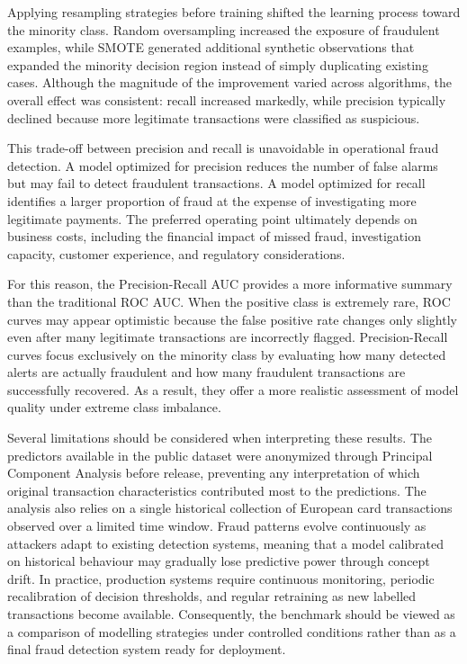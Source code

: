 \documentclass[
  12pt,
  letterpaper,
]{book}
\begin{document}
Applying resampling strategies before training shifted the learning
process toward the minority class. Random oversampling increased the
exposure of fraudulent examples, while SMOTE generated additional
synthetic observations that expanded the minority decision region
instead of simply duplicating existing cases. Although the magnitude of
the improvement varied across algorithms, the overall effect was
consistent: recall increased markedly, while precision typically
declined because more legitimate transactions were classified as
suspicious.

This trade-off between precision and recall is unavoidable in
operational fraud detection. A model optimized for precision reduces the
number of false alarms but may fail to detect fraudulent transactions. A
model optimized for recall identifies a larger proportion of fraud at
the expense of investigating more legitimate payments. The preferred
operating point ultimately depends on business costs, including the
financial impact of missed fraud, investigation capacity, customer
experience, and regulatory considerations.

For this reason, the Precision-Recall AUC provides a more informative
summary than the traditional ROC AUC. When the positive class is
extremely rare, ROC curves may appear optimistic because the false
positive rate changes only slightly even after many legitimate
transactions are incorrectly flagged. Precision-Recall curves focus
exclusively on the minority class by evaluating how many detected alerts
are actually fraudulent and how many fraudulent transactions are
successfully recovered. As a result, they offer a more realistic
assessment of model quality under extreme class imbalance.

Several limitations should be considered when interpreting these
results. The predictors available in the public dataset were anonymized
through Principal Component Analysis before release, preventing any
interpretation of which original transaction characteristics contributed
most to the predictions. The analysis also relies on a single historical
collection of European card transactions observed over a limited time
window. Fraud patterns evolve continuously as attackers adapt to
existing detection systems, meaning that a model calibrated on
historical behaviour may gradually lose predictive power through concept
drift. In practice, production systems require continuous monitoring,
periodic recalibration of decision thresholds, and regular retraining as
new labelled transactions become available. Consequently, the benchmark
should be viewed as a comparison of modelling strategies under
controlled conditions rather than as a final fraud detection system
ready for deployment.
\end{document}
